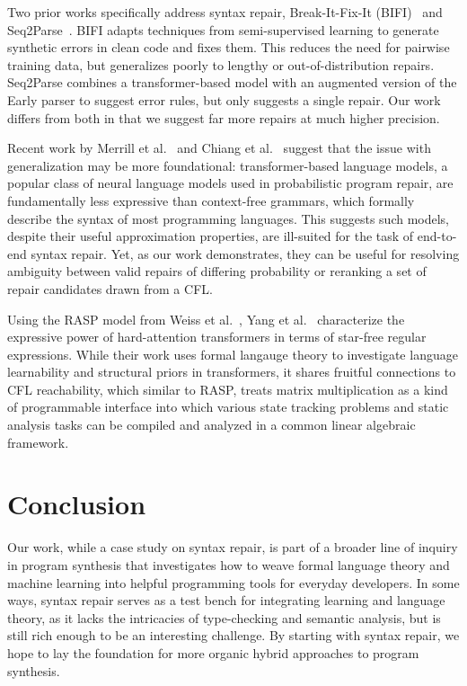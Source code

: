 \documentclass[sigplan,review,acmsmall,nonacm,screen,anonymous]{acmart}\settopmatter{printfolios=false,printccs=false,printacmref=false}
\begin{document}
Two prior works specifically address syntax repair, Break-It-Fix-It (BIFI)~\cite{yasunaga2021break} and Seq2Parse~\cite{sakkas2022seq2parse}. BIFI adapts techniques from semi-supervised learning to generate synthetic errors in clean code and fixes them. This reduces the need for pairwise training data, but generalizes poorly to lengthy or out-of-distribution repairs. Seq2Parse combines a transformer-based model with an augmented version of the Early parser to suggest error rules, but only suggests a single repair. Our work differs from both in that we suggest far more repairs at much higher precision.

Recent work by Merrill et al.~\cite{merrill2022saturated} and Chiang et al.~\cite{chiang2023tighter} suggest that the issue with generalization may be more foundational: transformer-based language models, a popular class of neural language models used in probabilistic program repair, are fundamentally less expressive than context-free grammars, which formally describe the syntax of most programming languages. This suggests such models, despite their useful approximation properties, are ill-suited for the task of end-to-end syntax repair. Yet, as our work demonstrates, they can be useful for resolving ambiguity between valid repairs of differing probability or reranking a set of repair candidates drawn from a CFL.

Using the RASP model from Weiss et al.~\cite{weiss2021thinking}, Yang et al.~\cite{yang2024masked} characterize the expressive power of hard-attention transformers in terms of star-free regular expressions. While their work uses formal langauge theory to investigate language learnability and structural priors in transformers, it shares fruitful connections to CFL reachability, which similar to RASP, treats matrix multiplication as a kind of programmable interface into which various state tracking problems and static analysis tasks can be compiled and analyzed in a common linear algebraic framework.

\clearpage\section{Conclusion}\label{sec:conclusion}

Our work, while a case study on syntax repair, is part of a broader line of inquiry in program synthesis that investigates how to weave formal language theory and machine learning into helpful programming tools for everyday developers. In some ways, syntax repair serves as a test bench for integrating learning and language theory, as it lacks the intricacies of type-checking and semantic analysis, but is still rich enough to be an interesting challenge. By starting with syntax repair, we hope to lay the foundation for more organic hybrid approaches to program synthesis.
\end{document}
